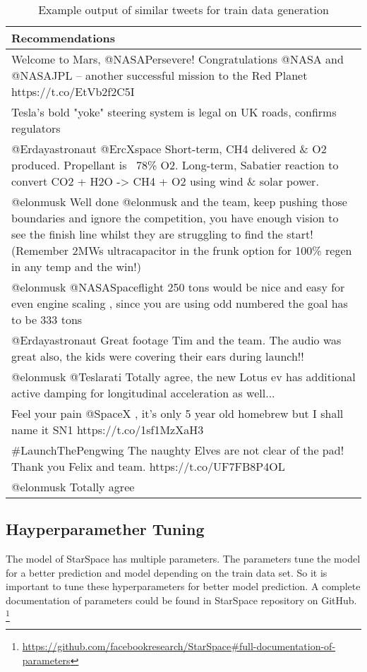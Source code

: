 \begin{table}[!h]
	\centering
	\caption{Example output of similar tweets for train data generation}
	\label{tab:example-train-data}
	\begin{tabular}{|m{}|}
		\hline
		\textbf{Recommendations} \\
		\hline
		Welcome to Mars, @NASAPersevere! Congratulations @NASA and @NASAJPL – another successful mission to the Red Planet https://t.co/EtVb2f2C5I \\
		\hline
		Tesla’s bold "yoke" steering system is legal on UK roads, confirms regulators \\
		\hline
		@Erdayastronaut @ErcXspace Short-term, CH4 delivered \& O2 produced. Propellant is ~78\% O2. Long-term, Sabatier reaction to convert CO2 + H2O -> CH4 + O2 using wind \& solar power. \\
		\hline
		@elonmusk Well done @elonmusk and the team, keep pushing those boundaries and ignore the competition,  you have enough vision to see the finish line whilst they are struggling to find the start! (Remember 2MWs ultracapacitor in the frunk option for 100\% regen in any temp and the win!) \\
		\hline
		@elonmusk @NASASpaceflight 250 tons would be nice and easy for even engine scaling , since you are using odd numbered the goal has to be 333 tons \\
		\hline
		@Erdayastronaut Great footage Tim and the team. The audio was great also,  the kids were covering their ears during launch!! \\
		\hline
		@elonmusk @Teslarati Totally agree, the new Lotus ev has additional active damping for longitudinal acceleration as well... \\
		\hline
		Feel your pain @SpaceX , it's only 5 year old homebrew but I shall name it SN1 https://t.co/1sf1MzXaH3 \\
		\hline
		\#LaunchThePengwing The naughty Elves are not clear of the pad! Thank you Felix and team. https://t.co/UF7FB8P4OL \\
		\hline
		@elonmusk Totally agree \\
		\hline
	\end{tabular}
\end{table}



\subsection{Hayperparamether Tuning}
The model of StarSpace has multiple parameters. The parameters tune the model for a better prediction and model depending on the train data set. So it is important to tune these hyperparameters for better model prediction. A complete documentation of parameters could be found in StarSpace repository on GitHub. \footnote{\url{https://github.com/facebookresearch/StarSpace\#full-documentation-of-parameters}}

